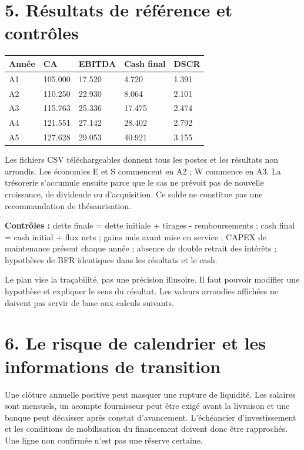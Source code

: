 \documentclass[12pt,a4paper]{article}
\begin{document}
\section*{5. Résultats de référence et contrôles}

\Needspace{250pt}
\begin{longtable}{p{2.84cm}p{2.84cm}p{2.84cm}p{2.84cm}p{2.84cm}}
\toprule
Année & CA & EBITDA & Cash final & DSCR \\
\midrule\endhead
A1 & 105.000 & 17.520 & 4.720 & 1.391 \\
A2 & 110.250 & 22.930 & 8.064 & 2.101 \\
A3 & 115.763 & 25.336 & 17.475 & 2.474 \\
A4 & 121.551 & 27.142 & 28.402 & 2.792 \\
A5 & 127.628 & 29.053 & 40.921 & 3.155 \\
\bottomrule
\end{longtable}

Les fichiers CSV téléchargeables donnent tous les postes et les résultats non arrondis. Les économies E et S commencent en A2 ; W commence en A3. La trésorerie s’accumule ensuite parce que le cas ne prévoit pas de nouvelle croissance, de dividende ou d’acquisition. Ce solde ne constitue pas une recommandation de thésaurisation.


\textbf{Contrôles :} dette finale = dette initiale + tirages - remboursements ; cash final = cash initial + flux nets ; gains nuls avant mise en service ; CAPEX de maintenance présent chaque année ; absence de double retrait des intérêts ; hypothèses de BFR identiques dans les résultats et le cash.


Le plan vise la traçabilité, pas une précision illusoire. Il faut pouvoir modifier une hypothèse et expliquer le sens du résultat. Les valeurs arrondies affichées ne doivent pas servir de base aux calculs suivants.

\section*{6. Le risque de calendrier et les informations de transition}
Une clôture annuelle positive peut masquer une rupture de liquidité. Les salaires sont mensuels, un acompte fournisseur peut être exigé avant la livraison et une banque peut décaisser après constat d’avancement. L’échéancier d’investissement et les conditions de mobilisation du financement doivent donc être rapprochés. Une ligne non confirmée n’est pas une réserve certaine.
\end{document}

